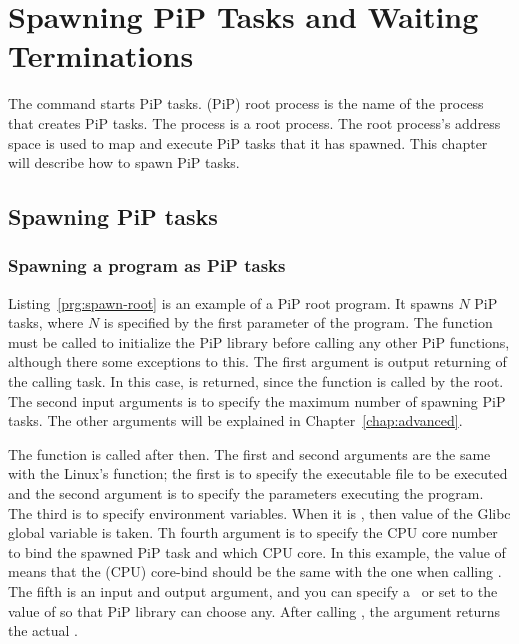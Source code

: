 
\section{Spawning PiP Tasks and Waiting Terminations}

The  command starts PiP tasks. (PiP) root process is
the name of the process that creates PiP tasks. The 
process is a root process.  
The root process's address space is used to map and execute PiP tasks
that it has spawned. This chapter will describe how to spawn PiP
tasks.

\subsection{Spawning PiP tasks}

\subsubsection{Spawning a program as PiP tasks}

Listing~\ref{prg:spawn-root} is an example of a PiP root program. It
spawns $N$ PiP tasks, where $N$ is specified by the first parameter
of the program. The  function must be called to
initialize the PiP library before calling any other PiP functions,
although there some exceptions to this. The first argument is
output returning {\PIPID} of the calling task. In this case,
 is returned, since the function is called by
the root. The second input arguments is to specify the maximum number
of spawning PiP tasks. The other arguments will be explained in 
Chapter~\ref{chap:advanced}.

The  function is called after then. The first and
second arguments are the same with the Linux's 
function; the first is to specify the executable file to be executed
and the second argument is to specify the parameters executing the
program. The third is to specify environment variables. When it is
{\NULL}, then value of the Glibc global variable  is
taken. Th fourth argument is to specify the CPU core number to bind
the spawned PiP task and which CPU core. In this example, the value of
 means that the (CPU) core-bind should be
the same with the one when calling . The fifth
is an input and output argument, and you can specify a \PIPID\ or
set to the value of  so that PiP library can choose
any. After calling , the argument returns the
actual \PIPID.

